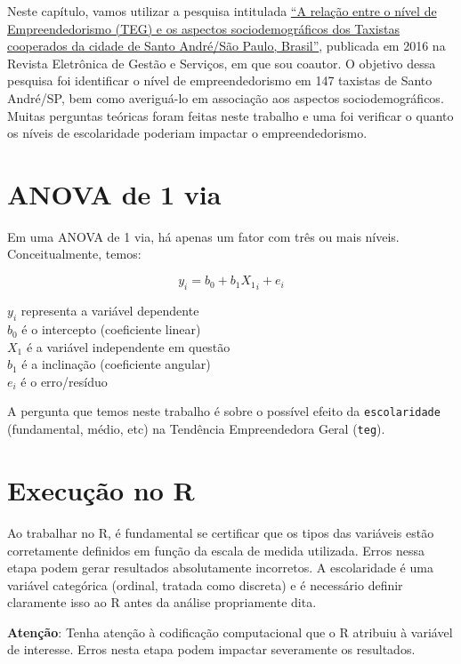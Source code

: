 \documentclass[
]{book}
\begin{document}
Neste capítulo, vamos utilizar a pesquisa intitulada \href{https://www.metodista.br/revistas/revistas-metodista/index.php/REGS/article/view/6453}{``A relação entre o nível de Empreendedorismo (TEG) e os aspectos sociodemográficos dos Taxistas cooperados da cidade de Santo André/São Paulo, Brasil''}, publicada em 2016 na Revista Eletrônica de Gestão e Serviços, em que sou coautor. O objetivo dessa pesquisa foi identificar o nível de empreendedorismo em 147 taxistas de Santo André/SP, bem como averiguá-lo em associação aos aspectos sociodemográficos. Muitas perguntas teóricas foram feitas neste trabalho e uma foi verificar o quanto os níveis de escolaridade poderiam impactar o empreendedorismo.

\hypertarget{anova-de-1-via}{%
\section{ANOVA de 1 via}\label{anova-de-1-via}}

Em uma ANOVA de 1 via, há apenas um fator com três ou mais níveis. Conceitualmente, temos:

\[y_i = b_0 + b_1X{_1}_i + e_i\]

\(y_i\) representa a variável dependente\\
\(b_0\) é o intercepto (coeficiente linear)\\
\(X_1\) é a variável independente em questão\\
\(b_1\) é a inclinação (coeficiente angular)\\
\(e_i\) é o erro/resíduo

A pergunta que temos neste trabalho é sobre o possível efeito da \texttt{escolaridade} (fundamental, médio, etc) na Tendência Empreendedora Geral (\texttt{teg}).

\hypertarget{execuuxe7uxe3o-no-r-6}{%
\section{Execução no R}\label{execuuxe7uxe3o-no-r-6}}

Ao trabalhar no R, é fundamental se certificar que os tipos das variáveis estão corretamente definidos em função da escala de medida utilizada. Erros nessa etapa podem gerar resultados absolutamente incorretos. A escolaridade é uma variável categórica (ordinal, tratada como discreta) e é necessário definir claramente isso ao R antes da análise propriamente dita.

\textbf{Atenção}: Tenha atenção à codificação computacional que o R atribuiu à variável de interesse. Erros nesta etapa podem impactar severamente os resultados.
\end{document}
